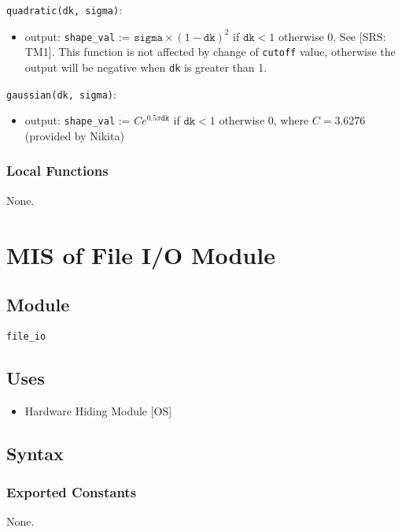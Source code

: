 \documentclass[12pt, titlepage]{article}
\begin{document}
\noindent \texttt{quadratic(dk, sigma)}:
\begin{itemize}
  \item output: \texttt{shape\_val} := $\texttt{sigma}\times(1-\texttt{dk})^2$ if $\texttt{dk} < 1$ otherwise 0. See [SRS: TM1].
  \newline This function is not affected by change of \texttt{cutoff} value, otherwise the output will be negative when \texttt{dk} is greater than 1.
\end{itemize}

\noindent \texttt{gaussian(dk, sigma)}:
\begin{itemize}
  \item output: \texttt{shape\_val} := $Ce^{0.5\pi\texttt{dk}}$ if $\texttt{dk} < 1$ otherwise 0,
  \newline where $C = 3.6276$ (provided by Nikita)
\end{itemize}

\subsubsection{Local Functions}

None.


\newpage
\section{MIS of File I/O Module} \label{mFile} 

\subsection{Module}
\texttt{file\_io}

\subsection{Uses}
\begin{itemize}
\item Hardware Hiding Module [OS]
\end{itemize}

\subsection{Syntax}

\subsubsection{Exported Constants}
None.
\end{document}
